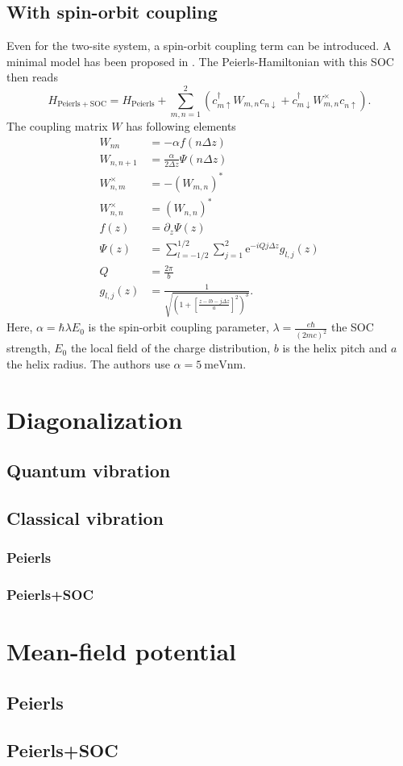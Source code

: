 \documentclass{article}
\newcommand{\exP}[1]{\mathrm{e}^{#1}}
\newcommand{\pdagger}{{\phantom{\dagger}}}
\begin{document}
\subsection{With spin-orbit coupling}
Even for the two-site system, a spin-orbit coupling term can be introduced. A minimal model has been proposed in \cite{Gutierrez_Díaz_Naaman_Cuniberti_2012}. The Peierls-Hamiltonian with this SOC then reads
\begin{equation}
	H_\mathrm{Peierls+SOC} = H_\mathrm{Peierls} + \sum_{m,n=1}^2( c_{m\uparrow}^\dagger W_{m,n}^\pdagger c_{n\downarrow}^\pdagger + c_{m\downarrow}^\dagger W^\times_{m,n} c_{n\uparrow}^\pdagger).
\end{equation}
The coupling matrix $W$ has following elements
\begin{align}
	W_{nn} &= -\alpha f(n\Delta z)\\
	W_{n,n+1} &= \frac{\alpha}{2\Delta z}\Psi(n\Delta z)\\
	W_{n,m}^\times &= -(W_{m,n})^*\\
	W_{n,n}^\times &= (W_{n,n})^*\\
	f(z) &= \partial_z \Psi(z)\\
	\Psi(z) &= \sum_{l=-1/2}^{1/2}\sum_{j=1}^2 \exP{-iQ j\Delta z} g_{l,j}(z)\\
	Q &=\frac{2\pi}{b}\\	
	g_{l,j}(z) &= \frac{1}{\sqrt{\left(1+\left[\frac{z-lb-j\Delta z}{a}\right]^2\right)^3}}.
\end{align}
Here, $\alpha=\hbar \lambda E_0$ is the spin-orbit coupling parameter, $\lambda = \frac{e\hbar}{(2mc)^2}$ the SOC strength, $E_0$ the local field of the charge distribution, $b$ is the helix pitch and $a$ the helix radius. The authors use $\alpha = \SI{5}{\milli\electronvolt \nano\meter}$.
\section{Diagonalization}
\subsection{Quantum vibration}
\subsection{Classical vibration}
\subsubsection{Peierls}
\subsubsection{Peierls+SOC}
\section{Mean-field potential}
\subsection{Peierls}
\subsection{Peierls+SOC}
\end{document}
